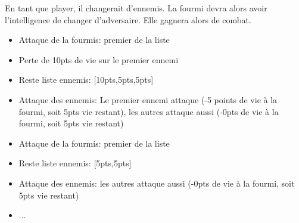			En tant que player, il changerait d'ennemis. La fourmi devra alors avoir l'intelligence de changer d'adversaire. Elle gagnera alors de combat.

			\begin{itemize}
				\item Attaque de la fourmis: premier de la liste
				\item Perte de 10pts de vie sur le premier ennemi
				\item Reste liste ennemis: [10pts,5pts,5pts]
				\item Attaque des ennemis: Le premier ennemi attaque (-5 points de vie à la fourmi, soit 5pts vie restant), les autres attaque aussi (-0pts de vie à la fourmi, soit 5pts vie restant)
				\item Attaque de la fourmis: premier de la liste
				\item Reste liste ennemis: [5pts,5pts]
				\item Attaque des ennemis: les autres attaque aussi (-0pts de vie à la fourmi, soit 5pts vie restant)
				\item ...
			\end{itemize}
